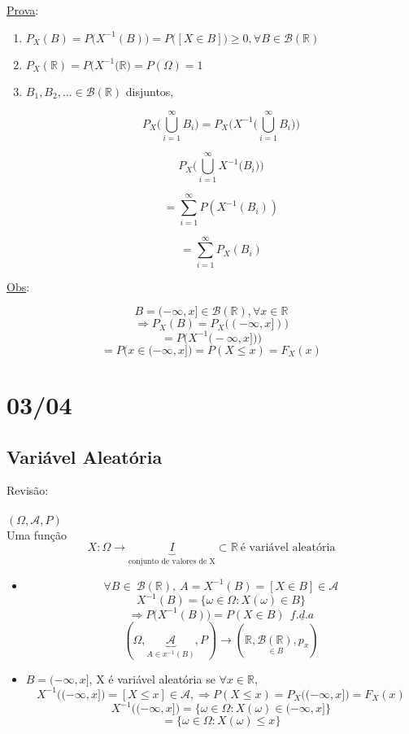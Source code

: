\documentclass[a4paper,12pt]{article}
\begin{document}
\underline{Prova}:
\begin{enumerate}[label=\roman*)]
	\item 

$P_X(B)=P\bigg(X^{-1}(B) \bigg)=P\bigg([X\in B]\bigg)\ge 0, \forall B \in \mathscr{B}(\mathbb{R}) $

\item $P_X(\mathbb{R})=P\bigg(X^{-1}(\mathbb{R}\bigg) = P(\Omega)=1 $

\item $B_1,B_2,\ldots \in \mathscr{B}(\mathbb{R})$ disjuntos,

$$P_X\bigg(\bigcup\limits_{i=1}^{\infty}B_i\bigg)= 
P_X\bigg(X^{-1}\bigg(\bigcup\limits_{i=1}^{\infty}B_i\bigg)\bigg)
 $$
 
 $$
 P_X\bigg(\bigcup\limits_{i=1}^{\infty}X^{-1}\bigg(B_i\bigg)\bigg)
 $$
 
 $$
 =\sum\limits_{i=1}^{\infty}P(X^{-1}(B_i))
 $$
 
 $$=\sum\limits_{i=1}^{\infty}P_X(B_i) $$
 
\end{enumerate}

\underline{Obs}:

$$B=(-\infty,x] \in \mathscr{B}(\mathbb{R}), \forall x\in \mathbb{R} $$
$$\Rightarrow P_X(B)= P_X\bigg( (-\infty,x])\bigg) $$
$$= P\bigg(X^{-1}\bigg(-\infty,x]\bigg)\bigg) $$
$$=P\bigg( x\in (-\infty,x] \bigg) = P(X\le x) = F_X(x)	 $$

\newpage

\section{03/04}

\subsection{Variável Aleatória }
Revisão:\\
\\


$(\Omega,\mathscr{A},P)$ \\
Uma função 
$$X:\Omega \longrightarrow \underbrace{I}_{\text{conjunto de valores de X}}\subset \mathbb{R}\ \text{é variável aleatória}$$

\begin{itemize}
	\item  $$\forall B \in \ \mathscr{B}(\mathbb{R}) , \ A=X^{-1}(B) = [ X\in B]\in \mathscr{A}$$
	$$X^{-1}(B)=\{\omega \in \Omega: X(\omega)\in B \} $$
	$$\Rightarrow P\bigg(X^{-1}(B)\bigg) = P(X\in B) \ \ \underline{f.d.a}$$
	$$(\Omega,\underbrace{\mathscr{A}}_{A \in x^{-1}(B)},P) \longrightarrow(\mathbb{R},\underset{\in B}{\mathscr{B}(\mathbb{R})},p_x) $$
\item $B=(-\infty,x]$, X é variável aleatória se $\forall x \in \mathbb{R}$,
$$X^{-1}\bigg( (-\infty,x] \bigg) = [X\le x]\in \mathscr{A}, \Rightarrow P(X\le x)=P_X\bigg( (-\infty,x] \bigg) =F_X(x) $$
$$X^{-1}\bigg( (-\infty,x] \bigg) =\{\omega \in \Omega: X(\omega)\in (-\infty,x]\} $$
$$=\{\omega \in \Omega: X(\omega)\le x \}  $$
\end{itemize}
\end{document}
